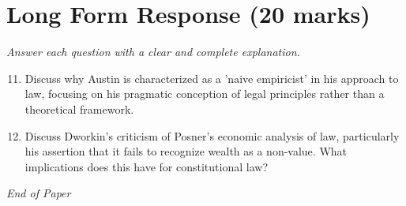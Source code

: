 \documentclass[12pt]{article}
\begin{document}
\section*{Long Form Response (20 marks)}
\textit{Answer each question with a clear and complete explanation.}
\begin{enumerate}[label=\arabic*.]
\setcounter{enumi}{10}
\item Discuss why Austin is characterized as a 'naive empiricist' in his approach to law, focusing on his pragmatic conception of legal principles rather than a theoretical framework.
\item Discuss Dworkin's criticism of Posner's economic analysis of law, particularly his assertion that it fails to recognize wealth as a non-value. What implications does this have for constitutional law?
\end{enumerate}

\vfill
\noindent\textit{End of Paper}
\end{document}
